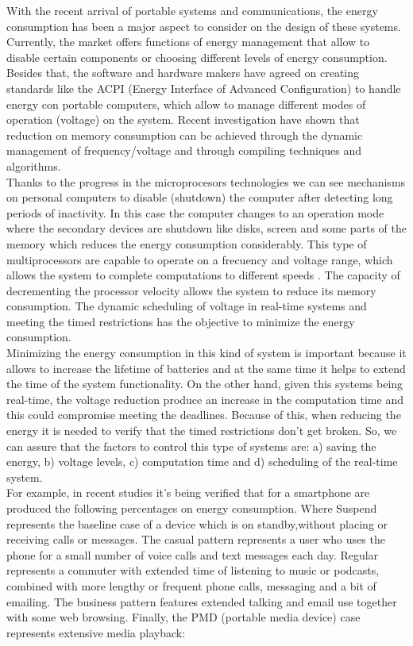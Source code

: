 \documentclass[conference]{IEEEtran}
\begin{document}
 With the recent arrival of portable systems and communications, the energy consumption has been a major aspect to consider on the design of these systems. Currently, the market offers functions of energy management that allow to disable certain components or choosing different levels of energy consumption. Besides that, the software and hardware makers have agreed on creating standards like the ACPI (Energy Interface of Advanced Configuration) to handle energy con portable computers, which allow to manage different modes of operation (voltage) on the system. Recent investigation have shown that reduction on memory consumption can be achieved through the dynamic management of frequency/voltage and through compiling techniques and algorithms.\\
 Thanks to the progress in the microprocesors technologies we can see mechanisms on personal computers to disable (shutdown) the computer after detecting long periods of inactivity. In this case the computer changes to an operation mode where the secondary devices are shutdown like disks, screen and some parts of the memory which reduces the energy consumption considerably. This type of multiprocessors are capable to operate on a frecuency and voltage range, which allows the system to complete computations to different speeds \cite{PADM01}. The capacity of decrementing the processor velocity allows the system to reduce its memory consumption. The dynamic scheduling of voltage in real-time systems and meeting the timed restrictions has the objective to minimize the energy consumption.\\

 Minimizing the energy consumption in this kind of system is important because it allows to increase the lifetime of batteries and at the same time it helps to extend the time of the system functionality. On the other hand, given this systems being real-time, the voltage reduction produce an increase in the computation time and this could compromise meeting the deadlines. Because of this, when reducing the energy it is needed to verify that the timed restrictions don't get broken. So, we can assure that the factors to control this type of systems are: a) saving the energy, b) voltage levels, c) computation time and d) scheduling of the real-time system.\\
 
 For example, in recent studies \cite{Carroll_ananalysis} it's being verified that for a smartphone are produced the following percentages on energy consumption. Where Suspend represents the baseline case of a device which is on standby,without placing or receiving calls or messages. The casual pattern represents a user who uses the phone for a small number of voice calls and text messages each day. Regular represents a commuter with extended time of listening to music or podcasts, combined with more lengthy or frequent phone calls, messaging and a bit of emailing. The business pattern features extended talking and email use together with some web browsing. Finally, the PMD (portable media device) case represents extensive media playback:
 
\end{document}
